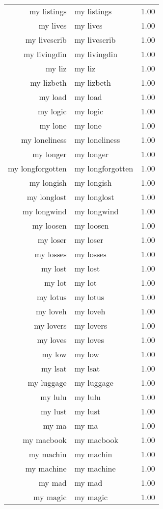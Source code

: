 \begin{table}[ht]
\begin{tabular}{rlr}
  my listings & my listings & 1.00 \\ 
  my lives & my lives & 1.00 \\ 
  my livescrib & my livescrib & 1.00 \\ 
  my livingdin & my livingdin & 1.00 \\ 
  my liz & my liz & 1.00 \\ 
  my lizbeth & my lizbeth & 1.00 \\ 
  my load & my load & 1.00 \\ 
  my logic & my logic & 1.00 \\ 
  my lone & my lone & 1.00 \\ 
  my loneliness & my loneliness & 1.00 \\ 
  my longer & my longer & 1.00 \\ 
  my longforgotten & my longforgotten & 1.00 \\ 
  my longish & my longish & 1.00 \\ 
  my longlost & my longlost & 1.00 \\ 
  my longwind & my longwind & 1.00 \\ 
  my loosen & my loosen & 1.00 \\ 
  my loser & my loser & 1.00 \\ 
  my losses & my losses & 1.00 \\ 
  my lost & my lost & 1.00 \\ 
  my lot & my lot & 1.00 \\ 
  my lotus & my lotus & 1.00 \\ 
  my loveh & my loveh & 1.00 \\ 
  my lovers & my lovers & 1.00 \\ 
  my loves & my loves & 1.00 \\ 
  my low & my low & 1.00 \\ 
  my lsat & my lsat & 1.00 \\ 
  my luggage & my luggage & 1.00 \\ 
  my lulu & my lulu & 1.00 \\ 
  my lust & my lust & 1.00 \\ 
  my ma & my ma & 1.00 \\ 
  my macbook & my macbook & 1.00 \\ 
  my machin & my machin & 1.00 \\ 
  my machine & my machine & 1.00 \\ 
  my mad & my mad & 1.00 \\ 
  my magic & my magic & 1.00 \\ 

\end{tabular}
\end{table}
